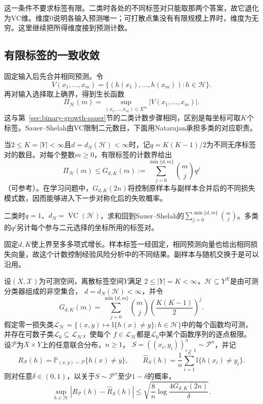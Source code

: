 这一条件不要求标签有限。二类时各处的不同标签对只能取那两个答案，故它退化为VC维。维度0说明各输入预测唯一；可打散点集没有有限规模上界时，维度为无穷。这里继续把所得维度接到预测计数。

\subsection{有限标签的一致收敛}

固定输入后先合并相同预测。令
\[
 V(x_1,\ldots,x_m)
 =\{(h(x_1),\ldots,h(x_m)):h\in\mathcal H\}.
\]
再对输入选择取上确界，得到生长函数
\[
 \Pi_{\mathcal H}(m)=\sup_{(x_1,\ldots,x_m)\in X^m}|V(x_1,\ldots,x_m)|.
\]
这与第~\ref{sec:binary-growth-sauer}节的二类计数步骤相同，区别是每坐标可取$K$个标签。Sauer--Shelah由VC限制二元数目，下面用Natarajan承担多类的对应职责。

\label{thm:learning-multiclass-growth-bound}
当$2\leq K=|Y|<\infty$且$d=d_N(\mathcal H)<\infty$时，记$q=K(K-1)/2$为不同无序标签对的数目。对每个整数$m\geq0$，有限标签的计数界给出
\[
 \Pi_{\mathcal H}(m)\leq G_{d,K}(m)
 :=\sum_{j=0}^{\min\{d,m\}}\binom mj q^j
\]
（可参考）。在学习问题中，$G_{d,K}(2n)$将控制原样本与副样本合并后的不同损失模式数，因而能够进入下一步对称化后的失败概率。

二类时$q=1$、$d_N=\operatorname{VC}(\mathcal H)$，求和回到Sauer--Shelah的$\sum_{j=0}^{\min\{d,m\}}\binom mj$。多类的$q^j$另计每个参与二元选择的坐标所用的标签对。

固定$d,K$使上界至多多项式增长。样本标签一经固定，相同预测向量也给出相同损失向量，故这个计数控制经验风险分析中的不同结果。副样本与随机交换于是可以沿用。

\begingroup
{}
\begin{theorem}[有限标签的一致收敛保证]
\label{thm:finite-label-uniform-convergence}
设$(X,\mathcal X)$为可测空间，离散标签空间$Y$满足
$2\leq|Y|=K<\infty$，$\mathcal H\subseteq Y^X$是由可测分类器组成的非空集合，
$d=d_N(\mathcal H)<\infty$，并令
\[
 G_{d,K}(m)=\sum_{j=0}^{\min\{d,m\}}\binom mj
 \left(\frac{K(K-1)}2\right)^j.
\]
假定零一损失类$\mathcal L_{\mathcal H}
=\{(x,y)\mapsto\mathbb I\{h(x)\neq y\}:h\in\mathcal H\}$中的每个函数均可测，
并存在可数子类$\mathcal L_0\subseteq\mathcal L_{\mathcal H}$，使每个
$f\in\mathcal L_{\mathcal H}$都是$\mathcal L_0$中某个函数序列的逐点极限。
设$\mathcal P$为$X\times Y$上的任意联合分布，$n\geq1$，
$S=((x_i,y_i))_{i=1}^n\sim\mathcal P^n$，并记
\[
 R_{\mathcal P}(h)=\mathbb P_{(x,y)\sim\mathcal P}\{h(x)\neq y\},\qquad
 \hat R_S(h)=\frac1n\sum_{i=1}^n\mathbb I\{h(x_i)\neq y_i\}.
\]
则对任意$\delta\in(0,1)$，以关于$S\sim\mathcal P^n$至少$1-\delta$的概率，
\begin{equation}
 \sup_{h\in\mathcal H}|R_{\mathcal P}(h)-\hat R_S(h)|
 \leq\sqrt{\frac8n\log\frac{4G_{d,K}(2n)}{\delta}}.
 \label{eq:finite-label-uniform-bound}
\end{equation}
\end{theorem}
\endgroup

